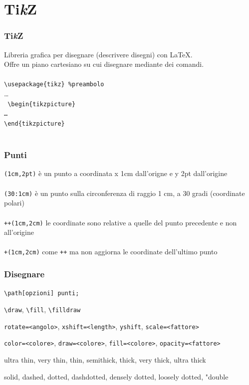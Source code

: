 \documentclass[aspectratio=169,compress]{beamer}
\newcommand{\1}{\ensuremath{\mathds{1}}}
\newcommand{\Tikz}{Ti\emph{k}Z}
\begin{document}
\section{\Tikz}
\begin{frame}\centering
\frametitle{\Tikz}
  Libreria grafica per disegnare (descrivere disegni) con LaTeX.\\\pause
  Offre un piano cartesiano su cui disegnare mediante dei comandi.\\~\\\pause
  \texttt{\textbackslash{}usepackage\{tikz\} \%preambolo}\\\pause
  \dots\\\texttt{
  \textbackslash{}begin\{tikzpicture\}\\
  \dots\\
  \textbackslash{}end\{tikzpicture\}~~\\~}
\end{frame}
\begin{frame}\centering
\frametitle{Punti}
  \texttt{(1cm,2pt)} è un punto a coordinata x 1cm dall'origne e y 2pt dall'origine\\~\\\pause
  \texttt{(30:1cm)} è un punto sulla circonferenza di raggio 1 cm, a 30 gradi (coordinate polari)\\~\\\pause
  \texttt{++(1cm,2cm)} le coordinate sono relative a quelle del punto precedente e non all'origine\\~\\\pause
  \texttt{+(1cm,2cm)} come \texttt{++} ma non aggiorna le coordinate dell'ultimo punto
\end{frame}
\begin{frame}\centering
\frametitle{Disegnare}
  \texttt{\textbackslash{}path[opzioni] punti;}\\\pause
  \begin{description}
    \item<2->[path type] \texttt{\textbackslash{}draw}, \texttt{\textbackslash{}fill}, \texttt{\textbackslash{}filldraw}
    \item<3->[geometria] \texttt{rotate=<angolo>}, \texttt{xshift=<length>}, \texttt{yshift}, \texttt{scale=<fattore>}
    \item<4->[colore] \texttt{color=<colore>}, \texttt{draw=<colore>}, \texttt{fill=<colore>}, \texttt{opacity=<fattore>}
    \item<5->[spessore linee] ultra thin, very thin, thin, semithick, thick, very thick, ultra thick
    \item<6->[tratteggio] solid, dashed, dotted, dashdotted, densely dotted, loosely dotted, "double
  \end{description}
\end{frame}
\end{document}
